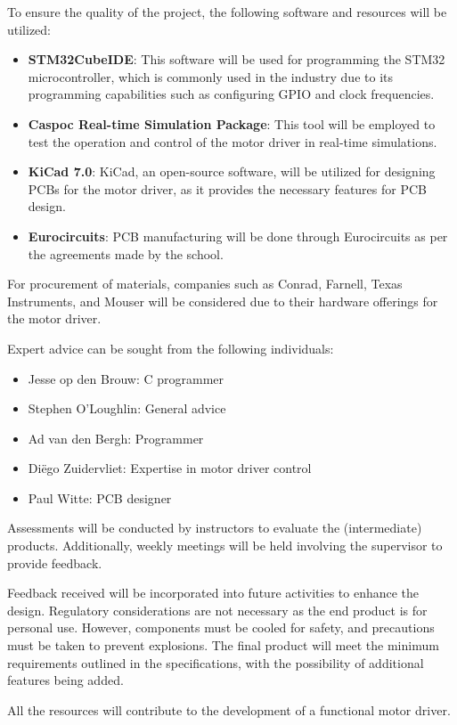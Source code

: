 To ensure the quality of the project, the following software and resources will be utilized:

\begin{itemize}
  \item \textbf{STM32CubeIDE}: This software will be used for programming the STM32 microcontroller, which is commonly used in the industry due to its programming capabilities such as configuring GPIO and clock frequencies.
  \item \textbf{Caspoc Real-time Simulation Package}: This tool will be employed to test the operation and control of the motor driver in real-time simulations.
  \item \textbf{KiCad 7.0}: KiCad, an open-source software, will be utilized for designing PCBs for the motor driver, as it provides the necessary features for PCB design.
  \item \textbf{Eurocircuits}: PCB manufacturing will be done through Eurocircuits as per the agreements made by the school.
\end{itemize}

For procurement of materials, companies such as Conrad, Farnell, Texas Instruments, and Mouser will be considered due to their hardware offerings for the motor driver.

Expert advice can be sought from the following individuals:
\begin{itemize}
  \item Jesse op den Brouw: C programmer
  \item Stephen O'Loughlin: General advice
  \item Ad van den Bergh: Programmer
  \item Diëgo Zuidervliet: Expertise in motor driver control
  \item Paul Witte: PCB designer
\end{itemize}

Assessments will be conducted by instructors to evaluate the (intermediate) products. Additionally, weekly meetings will be held involving the supervisor to provide feedback.

Feedback received will be incorporated into future activities to enhance the design. Regulatory considerations are not necessary as the end product is for personal use. However, components must be cooled for safety, and precautions must be taken to prevent explosions. The final product will meet the minimum requirements outlined in the specifications, with the possibility of additional features being added.

All the resources will contribute to the development of a functional motor driver.

